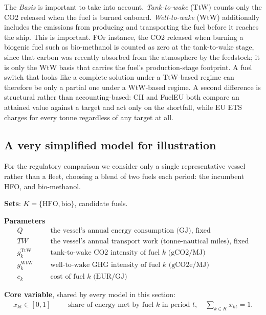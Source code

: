 The \textit{Basis} is important to take into account. \emph{Tank-to-wake} (TtW)
counts only the CO2 released when the fuel is burned onboard.
\emph{Well-to-wake} (WtW) additionally includes the emissions from
producing and transporting the fuel before it reaches the ship. This is important. FOr instance, 
the CO2 released when burning a biogenic fuel such as
bio-methanol is counted as zero at the tank-to-wake stage, since that
carbon was recently absorbed from the atmosphere by the feedstock; it is
only the WtW basis that carries the fuel's production-stage footprint. A
fuel switch that looks like a complete solution under a TtW-based regime
can therefore be only a partial one under a WtW-based regime. A
second difference is structural rather than accounting-based: CII and
FuelEU both compare an attained value against a target and act only on
the shortfall, while EU ETS charges for every tonne regardless of any
target at all.

\subsection{A very simplified model for illustration}
\label{sec:regimes-setting}

For the regulatory comparison we consider only a single representative
vessel rather than a fleet, choosing a blend of two fuels each period: the incumbent HFO, and
bio-methanol.

\medskip
\noindent\textbf{Sets}: $K=\{\text{HFO},\text{bio}\}$, candidate fuels.

\medskip
\noindent\textbf{Parameters}
\begin{align*}
  Q &&& \text{the vessel's annual energy consumption (GJ), fixed} \\
  TW &&& \text{the vessel's annual transport work (tonne-nautical miles), fixed} \\
  g_k^{\text{TtW}} &&& \text{tank-to-wake CO2 intensity of fuel } k \text{ (gCO2/MJ)} \\
  g_k^{\text{WtW}} &&& \text{well-to-wake GHG intensity of fuel } k \text{ (gCO2e/MJ)} \\
  c_k &&& \text{cost of fuel } k \text{ (EUR/GJ)}
\end{align*}

\noindent\textbf{Core variable}, shared by every model in this section:
\begin{align*}
  x_{kt}\in[0,1] &&& \text{share of energy met by fuel } k \text{ in period } t, \quad \sum_{k\in K}x_{kt}=1.
\end{align*}

